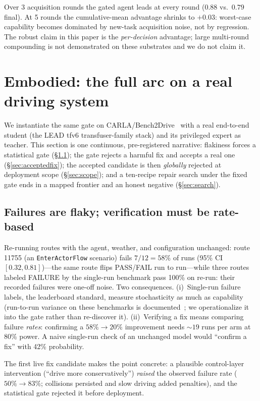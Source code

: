 \documentclass{article}
\begin{document}
Over 3 acquisition rounds the gated agent leads at every round ($0.88$ vs.\ $0.79$ final). At 5 rounds
the cumulative-mean advantage shrinks to $+0.03$: worst-case capability becomes dominated by
new-task acquisition noise, not by regression. The robust claim in this paper is the \emph{per-decision}
advantage; large multi-round compounding is not demonstrated on these substrates and we do not claim it.

\section{Embodied: the full arc on a real driving system}
\label{sec:embodied}

We instantiate the same gate on CARLA/Bench2Drive~\citep{dosovitskiy2017carla,jia2024bench2drive} with a
real end-to-end student (the LEAD tfv6 transfuser-family stack) and its privileged expert as teacher.
This section is one continuous, pre-registered narrative: flakiness forces a statistical gate
(\S\ref{sec:flaky}); the gate rejects a harmful fix and accepts a real one (\S\ref{sec:acceptedfix});
the accepted candidate is then \emph{globally} rejected at deployment scope (\S\ref{sec:scope}); and a
ten-recipe repair search under the fixed gate ends in a mapped frontier and an honest negative
(\S\ref{sec:search}).

\subsection{Failures are flaky; verification must be rate-based}
\label{sec:flaky}

Re-running routes with the agent, weather, and configuration unchanged: route 11755 (an
\texttt{EnterActorFlow} scenario) fails $7/12=58\%$ of runs (95\% CI $[0.32, 0.81]$)---the same route
flips PASS/FAIL run to run---while three routes labeled FAILURE by the single-run benchmark pass 100\%
on re-run: their recorded failures were one-off noise. Two consequences. (i)~Single-run failure labels,
the leaderboard standard, measure stochasticity as much as capability (run-to-run variance on these
benchmarks is documented~\citep{jia2024bench2drive}; we operationalize it into the gate rather than
re-discover it). (ii)~Verifying a fix means comparing failure \emph{rates}: confirming a
$58\%\!\to\!20\%$ improvement needs ${\sim}19$ runs per arm at 80\% power. A naive single-run check of
an unchanged model would ``confirm a fix'' with 42\% probability.

The first live fix candidate makes the point concrete: a plausible control-layer intervention
(``drive more conservatively'') \emph{raised} the observed failure rate ($50\%\!\to\!83\%$; collisions
persisted and slow driving added penalties), and the statistical gate rejected it before deployment.
\end{document}
